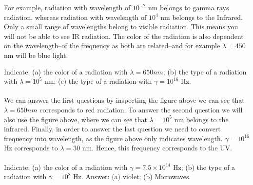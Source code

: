 \documentclass[main.tex]{subfiles}
\begin{document}
\begin{description}
\begin{marginfigure}[4cm]
 \end{marginfigure}%




For example, radiation with wavelength of $10^{-2}$ nm belongs to gamma rays radiation, whereas radiation with wavelength of $10^{4}$ nm belongs to the Infrared. Only a small range of wavelengths belong to visible radiation. This means you will not be able to see IR radiation. The color of the radiation is also dependent on the wavelength--of the frequency as both are related--and for example $\lambda=450$ nm will be blue light.
\begin{example} %
Indicate: (a) the color of a radiation with $\lambda=650nm$; (b) the type of a radiation with  $\lambda=10^{5}$ nm; (c) the type of a radiation with  $\gamma=10^{16}$ Hz.\\
\\
We can answer the first questions by inspecting the figure above we can see that $\lambda=650nm$ corresponds to red radiation. To answer the second question we will also use the figure above, where we can see that $\lambda=10^{5}$ nm belongs to the infrared. Finally, in order to answer the last question we need to convert frequency into wavelength, as the figure above only indicates wavelength. $\gamma=10^{16}$ Hz corresponds to $\lambda=30$ nm. Hence, this frequency corresponds to the UV.
\\
\faDiamond\ \\
Indicate: (a) the color of a radiation with $\gamma=7.5\times 10^{14}$ Hz; (b) the type of a radiation with  $\gamma=10^{8}$ Hz.
\flushright Answer: (a) violet; (b) Microwaves.
\end{example}%


\end{description}
\end{document}
